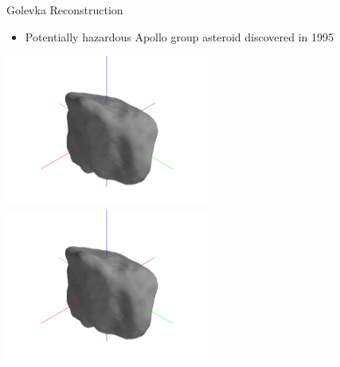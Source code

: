 \begin{frame}{Golevka Reconstruction}
    \begin{itemize}
        \item Potentially hazardous Apollo group asteroid discovered in 1995
    \end{itemize}
    \begin{center}
        \href{https://youtu.be/D5JJo1XfOeg}{\includegraphics[trim={20cm 10cm 20cm 10cm},clip,keepaspectratio,width=0.5\textwidth]{figures/mesh_update/golevka/partial_5285.jpg}}%
        \href{https://youtu.be/OoaWECewMVI}{\includegraphics[trim={20cm 10cm 20cm 10cm},clip,keepaspectratio,width=0.5\textwidth]{figures/mesh_update/golevka/partial_5285.jpg}}
\end{center}
\end{frame}

